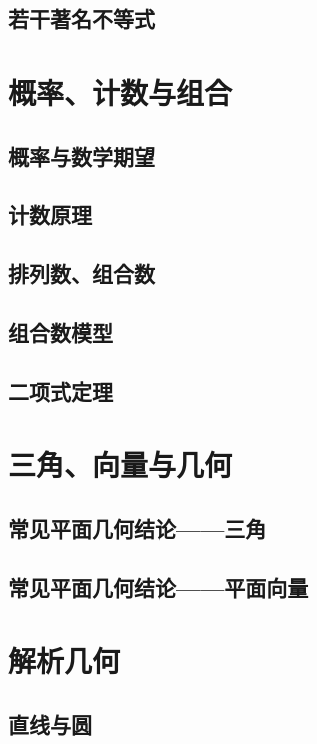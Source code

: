 \documentclass[lang=cn, zihao=4.5]{elegantbook}
\begin{document}
\section{若干著名不等式}

\chapter{概率、计数与组合}

\section{概率与数学期望}

\section{计数原理}

\section{排列数、组合数}

\section{组合数模型}

\section{二项式定理}

\chapter{三角、向量与几何}

\section{常见平面几何结论——三角}

\section{常见平面几何结论——平面向量}

\chapter{解析几何}

\section{直线与圆}
\end{document}
